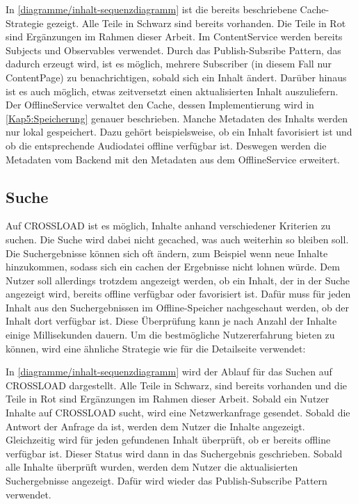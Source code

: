 
In \autoref{diagramme/inhalt-sequenzdiagramm} ist die bereits beschriebene Cache-Strategie gezeigt. Alle Teile in Schwarz sind bereits vorhanden. Die Teile in Rot sind Ergänzungen im Rahmen dieser Arbeit. Im ContentService werden bereits Subjects und Observables verwendet. Durch das Publish-Subsribe Pattern, das dadurch erzeugt wird, ist es möglich, mehrere Subscriber (in diesem Fall nur ContentPage) zu benachrichtigen, sobald sich ein Inhalt ändert. Darüber hinaus ist es auch möglich, etwas zeitversetzt einen aktualisierten Inhalt auszuliefern. Der OfflineService verwaltet den Cache, dessen Implementierung wird in \autoref{Kap5:Speicherung} genauer beschrieben. Manche Metadaten des Inhalts werden nur lokal gespeichert. Dazu gehört beispielsweise, ob ein Inhalt favorisiert ist und ob die entsprechende Audiodatei offline verfügbar ist. Deswegen werden die Metadaten vom Backend mit den Metadaten aus dem OfflineService erweitert.

\subsection{Suche}
Auf CROSSLOAD ist es möglich, Inhalte anhand verschiedener Kriterien zu suchen. Die Suche wird dabei nicht gecached, was auch weiterhin so bleiben soll. Die Suchergebnisse können sich oft ändern, zum Beispiel wenn neue Inhalte hinzukommen, sodass sich ein cachen der Ergebnisse nicht lohnen würde. Dem Nutzer soll allerdings trotzdem angezeigt werden, ob ein Inhalt, der in der Suche angezeigt wird, bereits offline verfügbar oder favorisiert ist. Dafür muss für jeden Inhalt aus den Suchergebnissen im Offline-Speicher nachgeschaut werden, ob der Inhalt dort verfügbar ist. Diese Überprüfung kann je nach Anzahl der Inhalte einige Millisekunden dauern. Um die bestmögliche Nutzererfahrung bieten zu können, wird eine ähnliche Strategie wie für die Detailseite verwendet:


In \autoref{diagramme/inhalt-sequenzdiagramm} wird der Ablauf für das Suchen auf CROSSLOAD dargestellt. Alle Teile in Schwarz, sind bereits vorhanden und die Teile in Rot sind Ergänzungen im Rahmen dieser Arbeit. Sobald ein Nutzer Inhalte auf CROSSLOAD sucht, wird eine Netzwerkanfrage gesendet. Sobald die Antwort der Anfrage da ist, werden dem Nutzer die Inhalte angezeigt. Gleichzeitig wird für jeden gefundenen Inhalt überprüft, ob er bereits offline verfügbar ist. Dieser Status wird dann in das Suchergebnis geschrieben. Sobald alle Inhalte überprüft wurden, werden dem Nutzer die aktualisierten Suchergebnisse angezeigt. Dafür wird wieder das Publish-Subscribe Pattern verwendet. 

